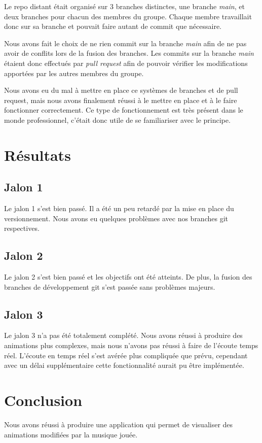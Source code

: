 \documentclass{article}
\begin{document}
Le repo distant était organisé sur 3 branches distinctes, une branche \textit{main}, et deux branches pour chacun des membres du groupe. Chaque membre travaillait donc sur sa branche et pouvait faire autant de commit que nécessaire. 

Nous avons fait le choix de ne rien commit sur la branche \textit{main} afin de ne pas avoir de conflits lors de la fusion des branches. Les commits sur la branche \textit{main} étaient donc effectués par \textit{pull request} afin de pouvoir vérifier les modifications apportées par les autres membres du groupe.

Nous avons eu du mal à mettre en place ce systèmes de branches et de pull request, mais nous avons finalement réussi à le mettre en place et à le faire fonctionner correctement. Ce type de fonctionnement est très présent dans le monde professionnel, c'était donc utile de se familiariser avec le principe.


\section{Résultats}

\subsection*{Jalon 1}
Le jalon 1 s'est bien passé. Il a été un peu retardé par la mise en place du versionnement. Nous avons eu quelques problèmes avec nos branches git respectives. 

\subsection*{Jalon 2}
Le jalon 2 s'est bien passé et les objectifs ont été atteints. De plus, la fusion des branches de développement git s'est passée sans problèmes majeurs. 

\subsection*{Jalon 3}
Le jalon 3 n'a pas été totalement complété. Nous avons réussi à produire des animations plus complexes, mais nous n'avons pas réussi à faire de l'écoute temps réel. L'écoute en temps réel s'est avérée plus compliquée que prévu, cependant avec un délai supplémentaire cette fonctionnalité aurait pu être implémentée.

\section{Conclusion}
Nous avons réussi à produire une application qui permet de visualiser des animations modifiées par la musique jouée. 
\end{document}
